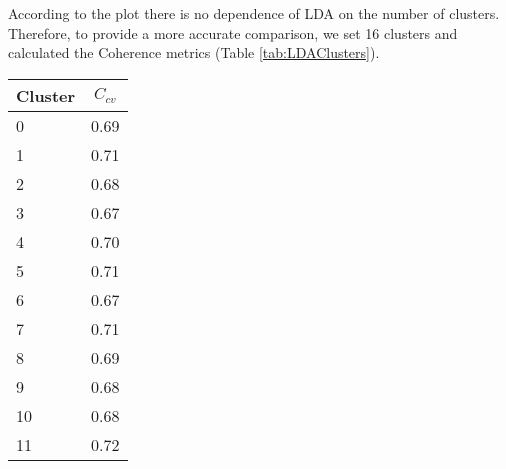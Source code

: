 \newpage
According to the plot there is no dependence of LDA on the number of clusters. Therefore, to provide a more accurate comparison, we set 16 clusters and calculated the Coherence metrics (Table \ref{tab:LDAClusters}). 

\begin{table}[h]
\centering
\begin{tabular}{|l|l|}
\hline
\multicolumn{1}{|c|}{\textbf{Cluster}}  & \multicolumn{1}{c|}{\textbf{$C_{cv}$}} \\ \hline
0                                                                                       & 0.69                                    \\ \hline
1                                                                                       & 0.71                                    \\ \hline
2                                                                                       & 0.68                                    \\ \hline
3                                                                                      & 0.67                                    \\ \hline
4                                                                                       & 0.70                                    \\ \hline
5                                                                                       & 0.71                                    \\ \hline
6                                                                                      & 0.67                                    \\ \hline
7                                                                                      & 0.71                                    \\ \hline
8                                                                                       & 0.69                                    \\ \hline
9                                                                                       & 0.68                                    \\ \hline
10                                                                                      & 0.68                                    \\ \hline
11                                                                                      & 0.72                                    \\ \hline

\end{tabular}
\end{table}
